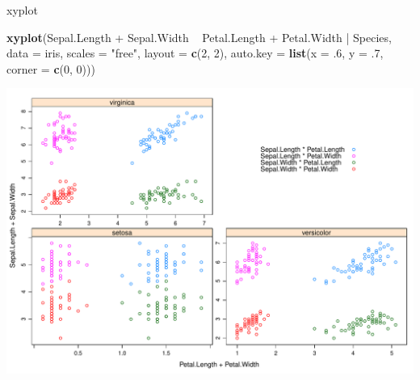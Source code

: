 \documentclass[ignorenonframetext,]{beamer}
\newenvironment{Shaded}{}{}
\newcommand{\KeywordTok}[1]{\textcolor[rgb]{0.00,0.44,0.13}{\textbf{{#1}}}}
\newcommand{\DataTypeTok}[1]{\textcolor[rgb]{0.56,0.13,0.00}{{#1}}}
\newcommand{\DecValTok}[1]{\textcolor[rgb]{0.25,0.63,0.44}{{#1}}}
\newcommand{\StringTok}[1]{\textcolor[rgb]{0.25,0.44,0.63}{{#1}}}
\newcommand{\NormalTok}[1]{{#1}}
\begin{document}
\begin{frame}[fragile]{xyplot}

\begin{Shaded}
\begin{Highlighting}[]
\KeywordTok{xyplot}\NormalTok{(Sepal.Length +}\StringTok{ }\NormalTok{Sepal.Width ~}\StringTok{ }\NormalTok{Petal.Length +}\StringTok{ }\NormalTok{Petal.Width |}\StringTok{ }\NormalTok{Species,}
       \DataTypeTok{data =} \NormalTok{iris, }\DataTypeTok{scales =} \StringTok{"free"}\NormalTok{, }\DataTypeTok{layout =} \KeywordTok{c}\NormalTok{(}\DecValTok{2}\NormalTok{, }\DecValTok{2}\NormalTok{),}
       \DataTypeTok{auto.key =} \KeywordTok{list}\NormalTok{(}\DataTypeTok{x =} \NormalTok{.}\DecValTok{6}\NormalTok{, }\DataTypeTok{y =} \NormalTok{.}\DecValTok{7}\NormalTok{, }\DataTypeTok{corner =} \KeywordTok{c}\NormalTok{(}\DecValTok{0}\NormalTok{, }\DecValTok{0}\NormalTok{)))}
\end{Highlighting}
\end{Shaded}

\includegraphics{R_intern_files/figure-beamer/unnamed-chunk-233-1.pdf}

\end{frame}
\end{document}
